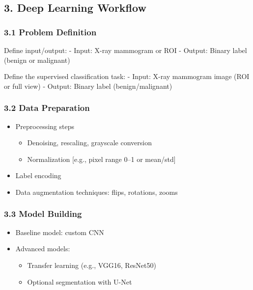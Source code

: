 \documentclass[
  12pt,
  letterpaper,
  DIV=11,
  numbers=noendperiod]{scrartcl}
\providecommand{\tightlist}{%
  \setlength{\itemsep}{0pt}\setlength{\parskip}{0pt}}
\begin{document}
\subsection{3. Deep Learning Workflow}\label{deep-learning-workflow}

\subsubsection{3.1 Problem Definition}\label{problem-definition}

Define input/output: - Input: X-ray mammogram or ROI - Output: Binary
label (benign or malignant)

Define the supervised classification task: - Input: X-ray mammogram
image (ROI or full view) - Output: Binary label (benign/malignant)

\subsubsection{3.2 Data Preparation}\label{data-preparation}

\begin{itemize}
\tightlist
\item
  Preprocessing steps

  \begin{itemize}
  \tightlist
  \item
    Denoising, rescaling, grayscale conversion
  \item
    Normalization {[}e.g., pixel range 0--1 or mean/std{]}
  \end{itemize}
\item
  Label encoding
\item
  Data augmentation techniques: flips, rotations, zooms
\end{itemize}

\subsubsection{3.3 Model Building}\label{model-building}

\begin{itemize}
\tightlist
\item
  Baseline model: custom CNN
\item
  Advanced models:

  \begin{itemize}
  \tightlist
  \item
    Transfer learning (e.g., VGG16, ResNet50)
  \item
    Optional segmentation with U-Net
  \end{itemize}
\end{itemize}
\end{document}
